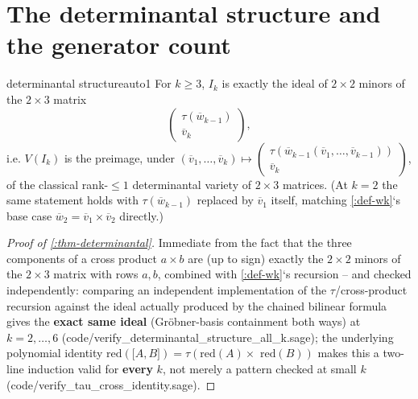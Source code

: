 \documentclass[a4paper,11pt]{scrartcl}
\begin{document}
\section{The determinantal structure and the generator count}

\begin{theorem}{determinantal structure}{auto1} For \(k \geq 3\), \(I_{k}\) is exactly the ideal of \(2 \times 2\) minors of the \(2 \times 3\) matrix \[\begin{pmatrix}
\tau({\overline{w}}_{k - 1}) \\
{\overline{v}}_{k}
\end{pmatrix},\] i.e. \(V\left( I_{k} \right)\) is the preimage, under \(\left( {\overline{v}}_{1},\ldots,{\overline{v}}_{k} \right) \mapsto \begin{pmatrix}
\tau({\overline{w}}_{k - 1}\left( {\overline{v}}_{1},\ldots,{\overline{v}}_{k - 1} \right)) \\
{\overline{v}}_{k}
\end{pmatrix}\), of the classical rank-\(\leq 1\) determinantal variety of \(2 \times 3\) matrices. (At \(k = 2\) the same statement holds with \(\tau({\overline{w}}_{k - 1})\) replaced by \({\overline{v}}_{1}\) itself, matching \cref{:def-wk}`s base case \({\overline{w}}_{2} = {\overline{v}}_{1} \times {\overline{v}}_{2}\) directly.)

\end{theorem} \protect{}\label{thm-determinantal}{}

\begin{proof}[Proof of \cref{:thm-determinantal}] Immediate from the fact that the three components of a cross product \(a \times b\) are (up to sign) exactly the \(2 \times 2\) minors of the \(2 \times 3\) matrix with rows \(a,b\), combined with \cref{:def-wk}`s recursion -- and checked independently: comparing an independent implementation of the \(\tau\)/cross-product recursion against the ideal actually produced by the chained bilinear formula gives the \textbf{exact same ideal} (Gröbner-basis containment both ways) at \(k = 2,\ldots,6\) (code/verify\_determinantal\_structure\_all\_k.sage); the underlying polynomial identity \(\text{red}\left( \lbrack A,B\rbrack \right) = \tau(\text{red}(A) \times \text{ red}(B))\) makes this a two-line induction valid for \textbf{every} \(k\), not merely a pattern checked at small \(k\) (code/verify\_tau\_cross\_identity.sage).

\end{proof}
\end{document}
